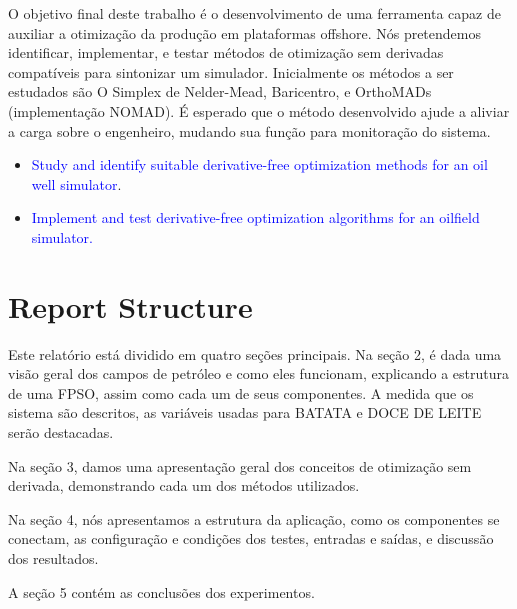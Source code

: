 O objetivo final deste trabalho é o desenvolvimento de uma ferramenta capaz de auxiliar a otimização da produção em plataformas offshore. Nós pretendemos identificar, implementar, e testar métodos de otimização sem derivadas compatíveis para sintonizar um simulador.
Inicialmente os métodos a ser estudados são O Simplex de Nelder-Mead, Baricentro, e OrthoMADs (implementação NOMAD).
É esperado que o método desenvolvido ajude a aliviar a carga sobre o engenheiro, mudando sua função para monitoração do sistema.

\begin{itemize}
 \item \textcolor{blue}{Study and identify suitable derivative-free optimization methods for an oil well simulator}.
 
 \item \textcolor{blue}{Implement and test derivative-free optimization algorithms for an oilfield simulator.}
 
\end{itemize}


\section{Report Structure}

Este relatório está dividido em quatro seções principais.
Na seção 2, é dada uma visão geral dos campos de petróleo e como eles funcionam, explicando a estrutura de uma FPSO, assim como cada um de seus componentes. A medida que os sistema são descritos, as variáveis usadas para BATATA e DOCE DE LEITE serão destacadas.

Na seção 3, damos uma apresentação geral dos conceitos de otimização sem derivada, demonstrando cada um dos métodos utilizados.

Na seção 4, nós apresentamos a estrutura da aplicação, como os componentes se conectam, as configuração e condições dos testes, entradas e saídas, e discussão dos resultados.

A seção 5 contém as conclusões dos experimentos.

 

